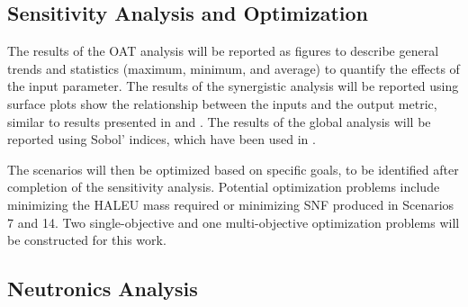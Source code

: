 \subsection{Sensitivity Analysis and Optimization}


The results of the \gls{OAT} analysis will be reported as figures 
to describe general trends and statistics (maximum, minimum, and 
average) to quantify the effects of the input parameter. 
The results 
of the synergistic analysis will be reported using surface plots show 
the relationship 
between the inputs and the output metric, similar to results presented in 
\cite{chee_sensitivity_2019} and \cite{passerini_systematic_2014}.
The results of the global analysis will be reported using Sobol' 
indices, which have been used in \cite{richards_application_2021}. 

The scenarios will then be optimized based on specific goals, to be 
identified after completion of the sensitivity analysis. 
Potential 
optimization problems include minimizing the \gls{HALEU} mass required 
or minimizing \gls{SNF} produced in Scenarios 7 and 14. Two 
single-objective and one multi-objective optimization problems will be 
constructed for this work.  

\subsection{Neutronics Analysis}

